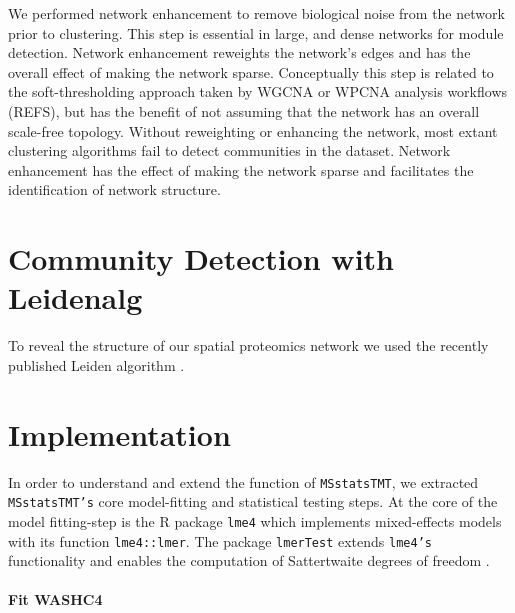 \documentclass[11pt]{elife}\usepackage[]{graphicx}\usepackage[]{color}
\begin{document}
We performed network enhancement to remove biological noise from the network
prior to clustering. This step is essential in large, and dense networks for
module detection. Network enhancement reweights the
network's edges and has the overall effect of making the network sparse.
Conceptually this step is related to the soft-thresholding approach taken by
WGCNA or WPCNA analysis workflows (REFS), but has the benefit of not assuming
that the network has an overall scale-free topology.  Without reweighting or
enhancing the network, most extant clustering algorithms fail to detect
communities in the dataset.  Network enhancement has the effect of making the
network sparse and facilitates the identification of network structure.\\


\section{Community Detection with Leidenalg}

To reveal the structure of our spatial proteomics network we used the recently
published Leiden algorithm \citep{Traag2019}.

\section{Implementation}

In order to understand and extend the function of \texttt{MSstatsTMT}, we
extracted \texttt{MSstatsTMT's} core model-fitting and statistical testing
steps.  At the core of the model fitting-step is the R package \texttt{lme4}
which implements mixed-effects models with its function
\texttt{lme4::lmer}\citep{Bates2015}. The package \texttt{lmerTest} extends
\texttt{lme4's} functionality and enables the computation of Sattertwaite
degrees of freedom \citep{Kuznetsova2017}. 

\paragraph{Fit WASHC4}
\end{document}
